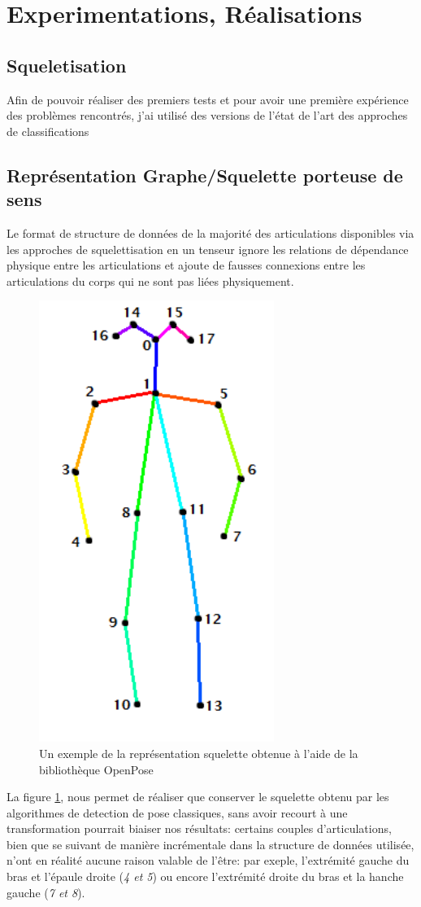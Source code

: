\clearpage
\section{Experimentations, Réalisations}
\label{sec:SOTA}

\subsection{Squeletisation}
Afin de pouvoir réaliser des premiers tests  et pour avoir une première expérience des problèmes rencontrés, j'ai utilisé des versions de l'état de l'art des approches de classifications 

\subsection{Représentation Graphe/Squelette porteuse de sens}
Le format de structure de données de la majorité des articulations disponibles via les approches de squelettisation en un tenseur ignore les relations de dépendance physique entre les articulations et ajoute de fausses connexions entre les articulations du corps qui ne sont pas liées physiquement.

\begin{figure}[H]
    \centering
    \includegraphics[width=0.3\linewidth]{Images/openpose.png}
    \caption{Un exemple de la représentation squelette obtenue à l'aide de la bibliothèque OpenPose \cite{cao2017realtime}}
    \label{fig:openPoseSkel}
\end{figure}

La figure \ref{fig:openPoseSkel}, nous permet de réaliser que conserver le squelette obtenu par les algorithmes de detection de pose classiques, sans avoir recourt à une transformation pourrait biaiser nos résultats: certains couples d'articulations, bien que se suivant de manière incrémentale dans la structure de données utilisée, n'ont en réalité aucune raison valable de l'être: par exeple, l'extrémité gauche du bras et l'épaule droite (\textit{4 et 5}) ou encore l'extrémité droite du bras et la hanche gauche (\textit{7 et 8}).

